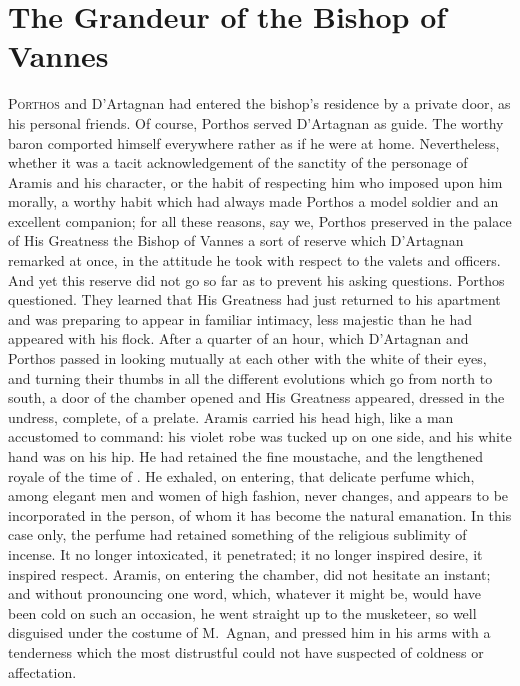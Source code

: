 \chapter{The Grandeur of the Bishop of Vannes}

\lettrine{P}{orthos} and D'Artagnan had entered the bishop's residence by a private door, as his personal friends. Of course, Porthos served D'Artagnan as guide. The worthy baron comported himself everywhere rather as if he were at home. Nevertheless, whether it was a tacit acknowledgement of the sanctity of the personage of Aramis and his character, or the habit of respecting him who imposed upon him morally, a worthy habit which had always made Porthos a model soldier and an excellent companion; for all these reasons, say we, Porthos preserved in the palace of His Greatness the Bishop of Vannes a sort of reserve which D'Artagnan remarked at once, in the attitude he took with respect to the valets and officers. And yet this reserve did not go so far as to prevent his asking questions. Porthos questioned. They learned that His Greatness had just returned to his apartment and was preparing to appear in familiar intimacy, less majestic than he had appeared with his flock. After a quarter of an hour, which D'Artagnan and Porthos passed in looking mutually at each other with the white of their eyes, and turning their thumbs in all the different evolutions which go from north to south, a door of the chamber opened and His Greatness appeared, dressed in the undress, complete, of a prelate. Aramis carried his head high, like a man accustomed to command: his violet robe was tucked up on one side, and his white hand was on his hip. He had retained the fine moustache, and the lengthened royale of the time of . He exhaled, on entering, that delicate perfume which, among elegant men and women of high fashion, never changes, and appears to be incorporated in the person, of whom it has become the natural emanation. In this case only, the perfume had retained something of the religious sublimity of incense. It no longer intoxicated, it penetrated; it no longer inspired desire, it inspired respect. Aramis, on entering the chamber, did not hesitate an instant; and without pronouncing one word, which, whatever it might be, would have been cold on such an occasion, he went straight up to the musketeer, so well disguised under the costume of M.~Agnan, and pressed him in his arms with a tenderness which the most distrustful could not have suspected of coldness or affectation.

